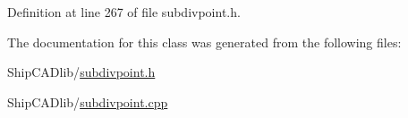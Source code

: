 Definition at line 267 of file subdivpoint.\+h.



The documentation for this class was generated from the following files\+:\begin{DoxyCompactItemize}
\item 
Ship\+C\+A\+Dlib/\hyperlink{subdivpoint_8h}{subdivpoint.\+h}\item 
Ship\+C\+A\+Dlib/\hyperlink{subdivpoint_8cpp}{subdivpoint.\+cpp}\end{DoxyCompactItemize}
